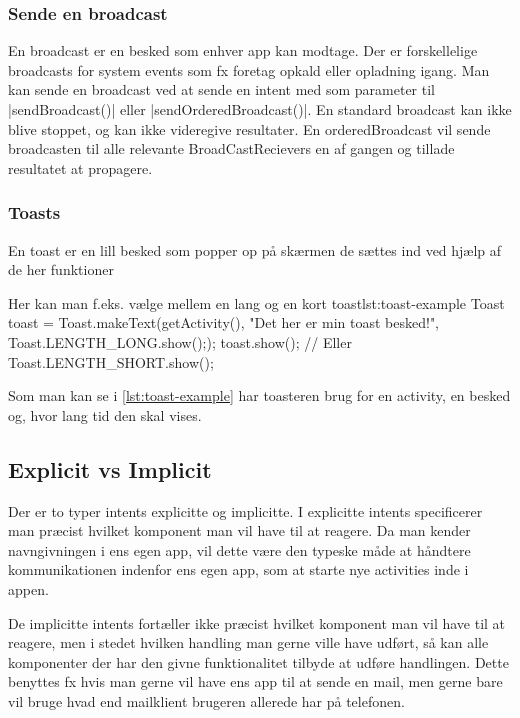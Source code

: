 \subsubsection{Sende en broadcast}

En broadcast er en besked som enhver app kan modtage. Der er forskellelige broadcasts for system events som fx foretag opkald eller opladning igang. Man kan sende en broadcast ved at sende en intent med som parameter til \JavaInline|sendBroadcast()| eller \JavaInline|sendOrderedBroadcast()|.
En standard broadcast kan ikke blive stoppet, og kan ikke videregive resultater. En orderedBroadcast vil sende broadcasten til alle relevante BroadCastRecievers en af gangen og tillade resultatet at propagere.

\subsubsection{Toasts}

En toast er en lill besked som popper op på skærmen de sættes ind ved hjælp af de her funktioner  

\begin{JavaCode}{Her kan man f.eks. vælge mellem en lang og en kort toast}{lst:toast-example}
	Toast toast = Toast.makeText(getActivity(), "Det her er min toast besked!", Toast.LENGTH_LONG.show(););
	toast.show();
	// Eller Toast.LENGTH_SHORT.show();
\end{JavaCode}

Som man kan se i \autoref{lst:toast-example} har toasteren brug for en activity, en besked og, hvor lang tid den skal vises.

\subsection{Explicit vs Implicit}

Der er to typer intents explicitte og implicitte. I explicitte intents specificerer man præcist hvilket komponent man vil have til at reagere. Da man kender navngivningen i ens egen app, vil dette være den typeske måde at håndtere kommunikationen indenfor ens egen app, som at starte nye activities inde i appen.

De implicitte intents fortæller ikke præcist hvilket komponent man vil have til at reagere, men i stedet hvilken handling man gerne ville have udført, så kan alle komponenter der har den givne funktionalitet tilbyde at udføre handlingen. Dette benyttes fx hvis man gerne vil have ens app til at sende en mail, men gerne bare vil bruge hvad end mailklient brugeren allerede har på telefonen.

